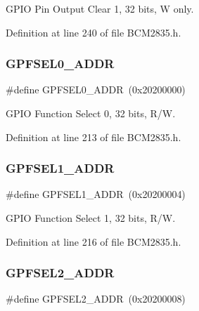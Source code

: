 G\+P\+IO Pin Output Clear 1, 32 bits, W only. 



Definition at line 240 of file B\+C\+M2835.\+h.

\mbox{\label{group__GPIO_ga0c3df699cdf9e7fae6f2555192c53b94}} 
\subsubsection{\texorpdfstring{G\+P\+F\+S\+E\+L0\+\_\+\+A\+D\+DR}{GPFSEL0\_ADDR}}
{\footnotesize\ttfamily \#define G\+P\+F\+S\+E\+L0\+\_\+\+A\+D\+DR~(0x20200000)}



G\+P\+IO Function Select 0, 32 bits, R/W. 



Definition at line 213 of file B\+C\+M2835.\+h.

\mbox{\label{group__GPIO_ga1e43ad10c82761bf4a40d368efc4dbe4}} 
\subsubsection{\texorpdfstring{G\+P\+F\+S\+E\+L1\+\_\+\+A\+D\+DR}{GPFSEL1\_ADDR}}
{\footnotesize\ttfamily \#define G\+P\+F\+S\+E\+L1\+\_\+\+A\+D\+DR~(0x20200004)}



G\+P\+IO Function Select 1, 32 bits, R/W. 



Definition at line 216 of file B\+C\+M2835.\+h.

\mbox{\label{group__GPIO_gaae4e338408363b99970dbb5ca4f525f2}} 
\subsubsection{\texorpdfstring{G\+P\+F\+S\+E\+L2\+\_\+\+A\+D\+DR}{GPFSEL2\_ADDR}}
{\footnotesize\ttfamily \#define G\+P\+F\+S\+E\+L2\+\_\+\+A\+D\+DR~(0x20200008)}



